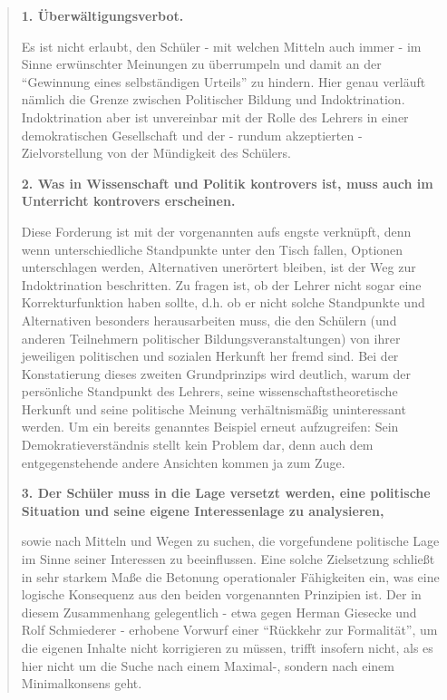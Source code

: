 \usepackage[]{minitoc}
\setcounter{secttocdepth}{4}
\setlength{\stcindent}{24pt}

\dosecttoc
\dosectlof
\dosectlot

\secttoc



\begin{quote}
    \textbf{1. Überwältigungsverbot.}

    Es ist nicht erlaubt, den Schüler - mit welchen Mitteln auch immer - im Sinne erwünschter Meinungen zu überrumpeln und damit an der \enquote{Gewinnung eines selbständigen Urteils} zu hindern. Hier genau verläuft nämlich die Grenze zwischen Politischer Bildung und Indoktrination. Indoktrination aber ist unvereinbar mit der Rolle des Lehrers in einer demokratischen Gesellschaft und der - rundum akzeptierten - Zielvorstellung von der Mündigkeit des Schülers. 

    \textbf{2. Was in Wissenschaft und Politik kontrovers ist, muss auch im Unterricht kontrovers erscheinen.}

    Diese Forderung ist mit der vorgenannten aufs engste verknüpft, denn wenn unterschiedliche Standpunkte unter den Tisch fallen, Optionen unterschlagen werden, Alternativen unerörtert bleiben, ist der Weg zur Indoktrination beschritten. Zu fragen ist, ob der Lehrer nicht sogar eine Korrekturfunktion haben sollte, d.h. ob er nicht solche Standpunkte und Alternativen besonders herausarbeiten muss, die den Schülern (und anderen Teilnehmern politischer Bildungsveranstaltungen) von ihrer jeweiligen politischen und sozialen Herkunft her fremd sind. Bei der Konstatierung dieses zweiten Grundprinzips wird deutlich, warum der persönliche Standpunkt des Lehrers, seine wissenschaftstheoretische Herkunft und seine politische Meinung verhältnismäßig uninteressant werden. Um ein bereits genanntes Beispiel erneut aufzugreifen: Sein Demokratieverständnis stellt kein Problem dar, denn auch dem entgegenstehende andere Ansichten kommen ja zum Zuge. 
    
    \textbf{3. Der Schüler muss in die Lage versetzt werden, eine politische Situation und seine eigene Interessenlage zu analysieren,} 

    sowie nach Mitteln und Wegen zu suchen, die vorgefundene politische Lage im Sinne seiner Interessen zu beeinflussen. Eine solche Zielsetzung schließt in sehr starkem Maße die Betonung operationaler Fähigkeiten ein, was eine logische Konsequenz aus den beiden vorgenannten Prinzipien ist. Der in diesem Zusammenhang gelegentlich - etwa gegen Herman Giesecke und Rolf Schmiederer - erhobene Vorwurf einer \enquote{Rückkehr zur Formalität}, um die eigenen Inhalte nicht korrigieren zu müssen, trifft insofern nicht, als es hier nicht um die Suche nach einem Maximal-, sondern nach einem Minimalkonsens geht. 
    
    \autocite[Im Original mit anderen Hervorhebungen:][179-180]{Wehling1977}
\end{quote}
